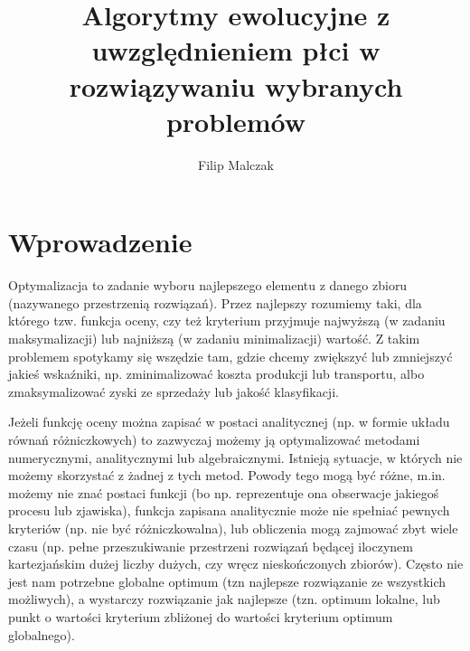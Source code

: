 \documentclass[twoside]{iisthesis}
\begin{document}
\title{Algorytmy ewolucyjne z uwzględnieniem płci w rozwiązywaniu wybranych problemów}
\author{Filip Malczak}

\date{\number\the\year}

	


\maketitle
\textpages

\chapter{Wprowadzenie}

Optymalizacja to zadanie wyboru najlepszego elementu z danego zbioru (nazywanego przestrzenią rozwiązań). 
Przez najlepszy rozumiemy taki, dla którego tzw. funkcja oceny, czy też kryterium przyjmuje najwyższą (w zadaniu maksymalizacji) lub najniższą (w zadaniu minimalizacji) wartość. 
Z takim problemem spotykamy się wszędzie tam, gdzie chcemy zwiększyć lub zmniejszyć jakieś wskaźniki, np. zminimalizować koszta produkcji lub transportu, albo zmaksymalizować zyski ze sprzedaży lub jakość klasyfikacji.

Jeżeli funkcję oceny można zapisać w postaci analitycznej (np. w formie układu równań różniczkowych) to zazwyczaj możemy ją optymalizować metodami numerycznymi, analitycznymi lub algebraicznymi. 
Istnieją sytuacje, w których nie możemy skorzystać z żadnej z tych metod. 
Powody tego mogą być różne, m.in. możemy nie znać postaci funkcji (bo np. reprezentuje ona obserwacje jakiegoś procesu lub zjawiska), funkcja zapisana analitycznie może nie spełniać pewnych kryteriów (np. nie być różniczkowalna), lub obliczenia mogą zajmować zbyt wiele czasu (np. pełne przeszukiwanie przestrzeni rozwiązań będącej iloczynem kartezjańskim dużej liczby dużych, czy wręcz nieskończonych zbiorów). 
Często nie jest nam potrzebne globalne optimum (tzn najlepsze rozwiązanie ze wszystkich możliwych), a wystarczy rozwiązanie jak najlepsze (tzn. optimum lokalne, lub punkt o wartości kryterium zbliżonej do wartości kryterium optimum globalnego).
\end{document}
